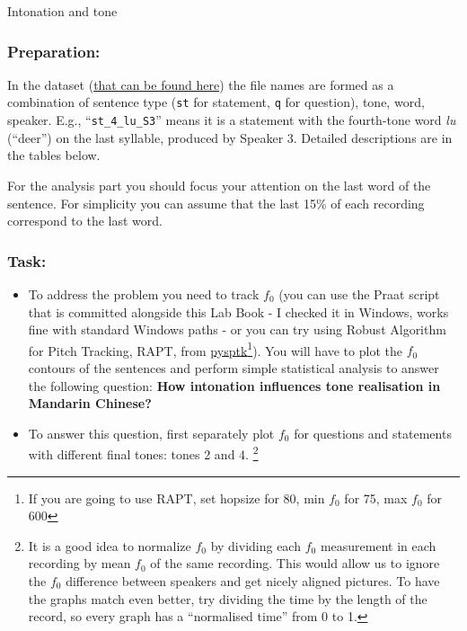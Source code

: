 \documentclass{../labbook}
\begin{document}
\begin{problem}{1}{10}{Intonation and tone}

\subsubsection*{Preparation:}

In the dataset (\href{https://drive.google.com/drive/folders/13bNOlbBJdNuvnBxX_OeiHOhqL3jiobXc?usp=sharing}{that can be found here}) the file names are formed as a combination of sentence type (\texttt{st} for statement, \texttt{q} for question), tone, word, speaker. E.g., “\texttt{st\_4\_lu\_S3}” means it is a statement with the fourth-tone word \textit{lu} (``deer'') on the last syllable, produced by Speaker 3. Detailed descriptions are in the tables below.

For the analysis part you should focus your attention on the last word of the sentence. For simplicity you can assume that the last 15\% of each recording correspond to the last word.


\subsubsection*{Task:}
\begin{itemize}
    \item To address the problem you need to track $f_0$ (you can use the Praat script that is committed alongside this Lab Book - I checked it in Windows, works fine with standard Windows paths - or you can try using Robust Algorithm for Pitch Tracking, RAPT, from \href{https://pysptk.readthedocs.io/en/latest/generated/pysptk.sptk.rapt.html}{pysptk}\footnote{If you are going to use RAPT, set hopsize for 80, min $f_0$ for 75, max $f_0$ for 600}). You will have to plot the $f_0$ contours of the sentences and perform simple statistical analysis to answer the following question:
    \textbf{How intonation influences tone realisation in Mandarin Chinese?} 
    
    \item To answer this question, first separately plot $f_0$ for questions and statements with different final tones: tones 2 and 4. \footnote{It is a good idea to normalize $f_0$ by dividing each $f_0$ measurement in each recording by mean $f_0$ of the same recording. This would allow us to ignore the $f_0$ difference between speakers and get nicely aligned pictures. To have the graphs match even better, try dividing the time by the length of the record, so every graph has a ``normalised time'' from 0 to 1.}


\end{itemize}
\end{problem}
\end{document}
